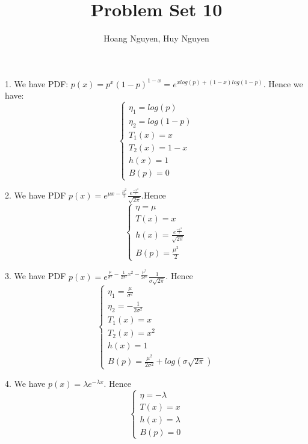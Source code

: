 \documentclass[10pt]{article}
\newenvironment{problem}[2][Problem]{\begin{trivlist}
\item[\hskip \labelsep {\bfseries #1}\hskip \labelsep {\bfseries #2.}]}{\end{trivlist}}
\begin{document}
\title{Problem Set 10}
\author{Hoang Nguyen, Huy Nguyen}
\maketitle
    
\begin{problem}{1}
\item 1.
We have PDF: $p(x) = p^{x}(1-p)^{1-x} = e^{xlog(p) + (1-x)log(1-p)}$. Hence we have: 
\[\begin{cases} \eta_{1}=log(p) \\ \eta_{2} = log(1-p) \\ T_{1}(x)= x \\ T_{2}(x)=1-x \\ h(x) = 1 \\ B(p)=0   \end{cases} \]




\item 2. 
We have PDF $p(x) = e^{\mu x- \frac{\mu^2}{2}}\frac{e^{\frac{-x^{2}}{2}}}{\sqrt{2\pi}}$.Hence
\[\begin{cases} \eta=\mu \\  T(x)= x  \\ h(x) = \frac{e^{\frac{-x^{2}}{2}}}{\sqrt{2\pi}} \\ B(p)=\frac{\mu^2}{2}   \end{cases} \]




\item 3. 
We have PDF $p(x) = e^{\frac{\mu}{\sigma^2} - \frac{1}{2\sigma^2}x^{2} - \frac{\mu^2}{2\sigma^2}}\frac{1}{\sigma\sqrt{2\pi}}$. Hence
\[ \begin{cases} \eta_{1}=\frac{\mu}{\sigma^2} \\ \eta_{2} = -\frac{1}{2\sigma^2} \\ T_{1}(x)= x \\ T_{2}(x)=x^{2} \\ h(x) = 1 \\ B(p)=\frac{\mu^2}{2\sigma^2} + log(\sigma\sqrt{2\pi})   \end{cases} \]

\item 4.
We have $p(x) = \lambda e^{-\lambda x}$. Hence
\[ \begin{cases} \eta=-\lambda \\  T(x)= x  \\ h(x) = \lambda \\ B(p)=0   \end{cases}\]


\end{problem}
\end{document}
